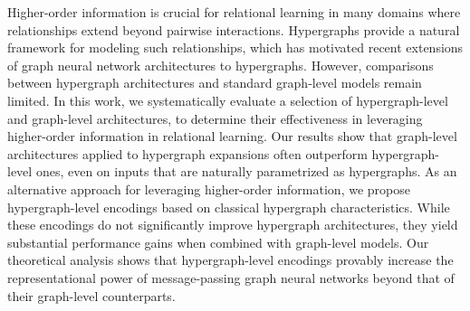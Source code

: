 Higher-order information is crucial for relational learning in many domains where relationships extend beyond pairwise interactions. Hypergraphs provide a natural framework for modeling such relationships, which has motivated recent extensions of graph neural network architectures to hypergraphs. However, comparisons between hypergraph architectures and standard graph-level models remain limited. In this work, we systematically evaluate a selection of hypergraph-level and graph-level architectures, to determine their effectiveness in leveraging higher-order information in relational learning. Our results show that graph-level architectures applied to hypergraph expansions often outperform hypergraph-level ones, even on inputs that are naturally parametrized as hypergraphs. As an alternative approach for leveraging higher-order information, we propose hypergraph-level encodings based on classical hypergraph characteristics. While these encodings do not significantly improve hypergraph architectures, they yield substantial performance gains when combined with graph-level models. Our theoretical analysis shows that hypergraph-level encodings provably increase the representational power of message-passing graph neural networks beyond that of their graph-level counterparts.


